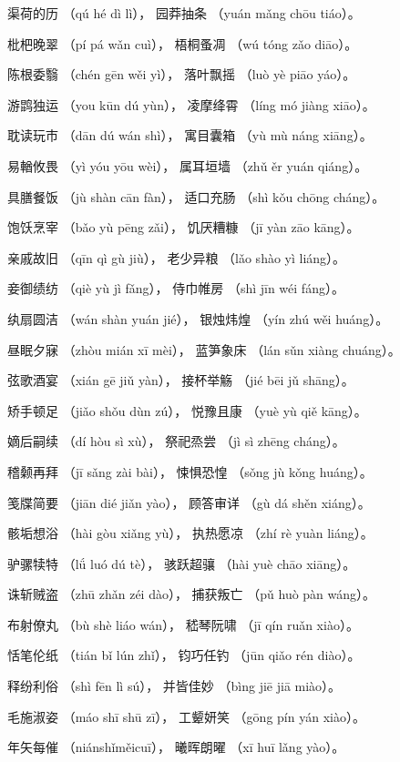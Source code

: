 \documentclass[12pt]{article}%
\begin{document}
\begin{appendices}
\begin{subappendix}
\begin{center}
渠荷的历 （qú hé dì lì）， 园莽抽条 （yuán mǎng chōu tiáo）。

枇杷晚翠 （pí pá wǎn cuì）， 梧桐蚤凋 （wú tóng zǎo diāo）。

陈根委翳 （chén gēn wěi yì）， 落叶飘摇 （luò yè piāo yáo）。

游鹍独运 （you kūn dú yùn）， 凌摩绛霄 （líng mó jiàng xiāo）。

耽读玩市 （dān dú wán shì）， 寓目囊箱 （yù mù náng xiāng）。

易輶攸畏 （yì yóu yōu wèi）， 属耳垣墙 （zhǔ ěr yuán qiáng）。

具膳餐饭 （jù shàn cān fàn）， 适口充肠 （shì kǒu chōng cháng）。

饱饫烹宰 （bǎo yù pēng zǎi）， 饥厌糟糠 （jī yàn zāo kāng）。

亲戚故旧 （qīn qì gù jiù）， 老少异粮 （lǎo shào yì liáng）。

妾御绩纺 （qiè yù jì fǎng）， 侍巾帷房 （shì jīn wéi fáng）。

纨扇圆洁 （wán shàn yuán jié）， 银烛炜煌 （yín zhú wěi huáng）。

昼眠夕寐 （zhòu mián xī mèi）， 蓝笋象床 （lán sǔn xiàng chuáng）。

弦歌酒宴 （xián gē jiǔ yàn）， 接杯举觞 （jié bēi jǔ shāng）。

矫手顿足 （jiǎo shǒu dùn zú）， 悦豫且康 （yuè yù qiě kāng）。

嫡后嗣续 （dí hòu sì xù）， 祭祀烝尝 （jì sì zhēng cháng）。

稽颡再拜 （jī sǎng zài bài）， 悚惧恐惶 （sǒng jù kǒng huáng）。

笺牒简要 （jiān dié jiǎn yào）， 顾答审详 （gù dá shěn xiáng）。

骸垢想浴 （hài gòu xiǎng yù）， 执热愿凉 （zhí rè yuàn liáng）。

驴骡犊特 （lǘ luó dú tè）， 骇跃超骧 （hài yuè chāo xiāng）。

诛斩贼盗 （zhū zhǎn zéi dào）， 捕获叛亡 （pǔ huò pàn wáng）。

布射僚丸 （bù shè liáo wán）， 嵇琴阮啸 （jī qín ruǎn xiào）。

恬笔伦纸 （tián bǐ lún zhǐ）， 钧巧任钓 （jūn qiǎo rén diào）。

释纷利俗 （shì fēn lì sú）， 并皆佳妙 （bìng jiē jiā miào）。

毛施淑姿 （máo shī shū zī）， 工颦妍笑 （gōng pín yán xiào）。

年矢每催 （niánshǐměicuī）， 曦晖朗曜 （xī huī lǎng yào）。


\end{center}
\end{subappendix}
\end{appendices}
\end{document}
